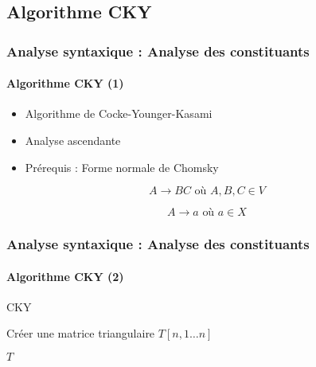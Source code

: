\documentclass[xcolor=table]{beamer}
\begin{document}
\subsection{Algorithme CKY}

\begin{frame}
\frametitle{Analyse syntaxique : Analyse des constituants}
\framesubtitle{Algorithme CKY (1)}

\begin{itemize}
	\item Algorithme de Cocke-Younger-Kasami
	\item Analyse ascendante
	\item Prérequis : Forme normale de Chomsky
\end{itemize}

\begin{definition}
	\[
	A \rightarrow  B C \text{ où } A, B, C \in V
	\]
	
	\[
	A \rightarrow a \text{ où } a \in X
	\]
\end{definition}

\end{frame}

\begin{frame}
\frametitle{Analyse syntaxique : Analyse des constituants}
\framesubtitle{Algorithme CKY (2)}

\begin{block}{CKY}
	\scriptsize
	\begin{algorithm}[H]
		
		Créer une matrice triangulaire $T[n, 1 \ldots n]$\;
		
	
		\Retour $T$ \;
		
	\end{algorithm}
\end{block}

\end{frame}
\end{document}
